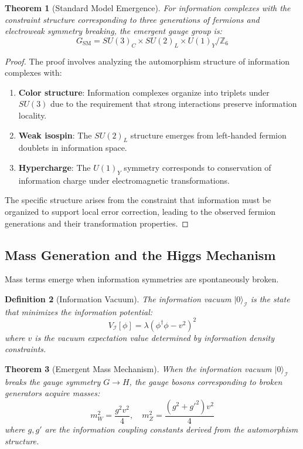 \documentclass{article}
\newtheorem{theorem}{Theorem}[section]
\newtheorem{definition}[theorem]{Definition}
\begin{document}
\begin{theorem}[Standard Model Emergence]
\label{thm:sm_emergence}
For information complexes with the constraint structure corresponding to three generations of fermions and electroweak symmetry breaking, the emergent gauge group is:
\begin{equation}
G_{\text{SM}} = SU(3)_C \times SU(2)_L \times U(1)_Y / \mathbb{Z}_6
\end{equation}
\end{theorem}

\begin{proof}
The proof involves analyzing the automorphism structure of information complexes with:
\begin{enumerate}
\item \textbf{Color structure}: Information complexes organize into triplets under $SU(3)$ due to the requirement that strong interactions preserve information locality.
\item \textbf{Weak isospin}: The $SU(2)_L$ structure emerges from left-handed fermion doublets in information space.
\item \textbf{Hypercharge}: The $U(1)_Y$ symmetry corresponds to conservation of information charge under electromagnetic transformations.
\end{enumerate}

The specific structure arises from the constraint that information must be organized to support local error correction, leading to the observed fermion generations and their transformation properties.
\end{proof}

\subsection{Mass Generation and the Higgs Mechanism}

Mass terms emerge when information symmetries are spontaneously broken.

\begin{definition}[Information Vacuum]
The information vacuum $|0\rangle_{\mathcal{I}}$ is the state that minimizes the information potential:
\begin{equation}
V_{\mathcal{I}}[\phi] = \lambda(\phi^\dagger\phi - v^2)^2
\end{equation}
where $v$ is the vacuum expectation value determined by information density constraints.
\end{definition}

\begin{theorem}[Emergent Mass Mechanism]
When the information vacuum $|0\rangle_{\mathcal{I}}$ breaks the gauge symmetry $G \to H$, the gauge bosons corresponding to broken generators acquire masses:
\begin{equation}
m_W^2 = \frac{g^2 v^2}{4}, \quad m_Z^2 = \frac{(g^2 + g'^2) v^2}{4}
\end{equation}
where $g, g'$ are the information coupling constants derived from the automorphism structure.
\end{theorem}
\end{document}
